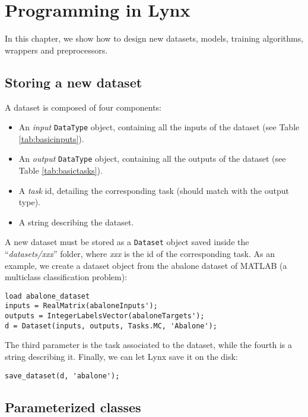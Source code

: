 \chapter{Programming in Lynx}
\label{chap:programminglynx}

In this chapter, we show how to design new datasets, models, training algorithms, wrappers and preprocessors.

\section{Storing a new dataset}

A dataset is composed of four components:

\begin{itemize}
\item An \textit{input} \verb|DataType| object, containing all the inputs of the dataset (see Table \ref{tab:basicinputs}).
\item An \textit{output} \verb|DataType| object, containing all the outputs of the dataset (see Table \ref{tab:basictasks}).
\item A \textit{task} id, detailing the corresponding task (should match with the output type).
\item A string describing the dataset.
\end{itemize}

A new dataset must be stored as a \verb|Dataset| object saved inside the ``\textit{datasets/xxx}'' folder, where \textit{xxx} is the id of the corresponding task. As an example, we create a dataset object from the abalone dataset of MATLAB (a multiclass classification problem):

\begin{lstlisting}
load abalone_dataset
inputs = RealMatrix(abaloneInputs');
outputs = IntegerLabelsVector(abaloneTargets');
d = Dataset(inputs, outputs, Tasks.MC, 'Abalone');
\end{lstlisting} 

\noindent The third parameter is the task associated to the dataset, while the fourth is a string describing it. Finally, we can let Lynx save it on the disk:

\begin{lstlisting}
save_dataset(d, 'abalone');
\end{lstlisting}

\section{Parameterized classes}
\label{sec:parameterizedclasses}

